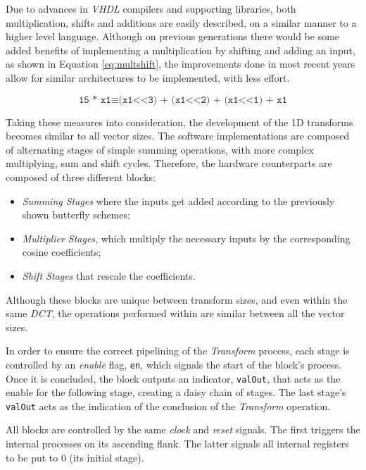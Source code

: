 Due to advances in \emph{VHDL} compilers and supporting libraries, both multiplication, shifts and additions are easily described, on a similar manner to a higher level language. Although on previous generations there would be some added benefits of implementing a multiplication by shifting and adding an input, as shown in Equation \ref{eq:multshift}, the improvements done in most recent years allow for similar architectures to be implemented, with less effort.

\begin{equation} \label{eq:multshift}
    \texttt{15 * x1} \equiv \texttt{(x1<<3) + (x1<<2) + (x1<<1) + x1}
\end{equation}

Taking these measures into consideration, the development of the 1D transforms becomes similar to all vector sizes. The software implementations are composed of alternating stages of simple summing operations, with more complex multiplying, sum and shift cycles. Therefore, the hardware counterparts are composed of three different blocks:

\begin{itemize}
    \item \emph{Summing Stages} where the inputs get added according to the previously shown butterfly schemes;
    \item \emph{Multiplier Stages}, which multiply the necessary inputs by the corresponding cosine coefficients;
    \item \emph{Shift Stages} that rescale the coefficients.
\end{itemize} 

Although these blocks are unique between transform sizes, and even within the same \emph{DCT}, the operations performed within are similar between all the vector sizes.

In order to ensure the correct pipelining of the \emph{Transform} process, each stage is controlled by an \emph{enable} flag, \texttt{en}, which signals the start of the block's process. Once it is concluded, the block outputs an indicator, \texttt{valOut}, that acts as the enable for the following stage, creating a daisy chain of stages. The last stage's \texttt{valOut} acts as the indication of the conclusion of the \emph{Transform} operation.

All blocks are controlled by the same \emph{clock} and \emph{reset} signals. The first triggers the internal processes on its ascending flank. The latter signals all internal registers to be put to 0 (its initial stage).

